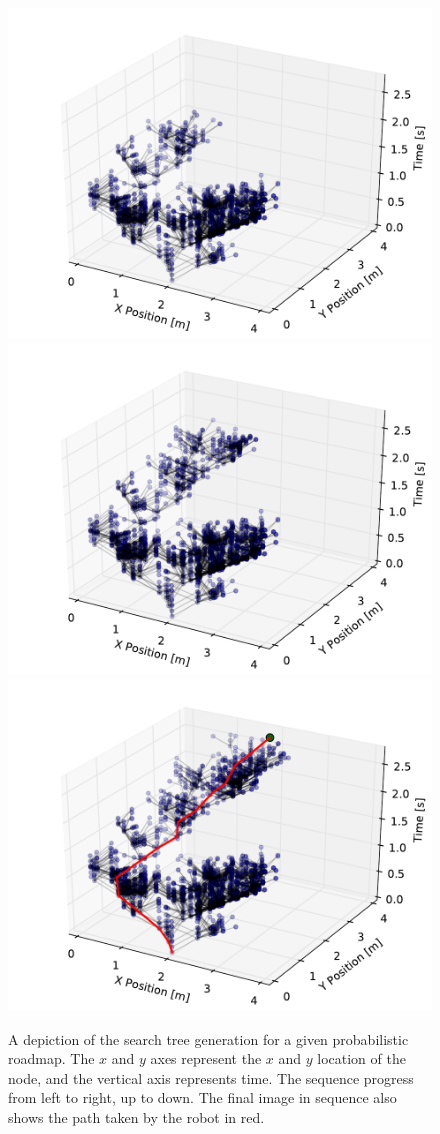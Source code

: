 \documentclass[letterpaper, 10pt, conference]{ieeeconf}
\begin{document}
\begin{figure}[h!]
    \includegraphics[width=0.32\linewidth]{figs/tree_6}
    \includegraphics[width=0.32\linewidth]{figs/tree_7}
    \includegraphics[width=0.32\linewidth]{figs/tree_8}

    \caption{A depiction of the search tree generation for a given
    probabilistic roadmap. The $x$ and $y$ axes represent the $x$ and $y$
location of the node, and the vertical axis represents time. The sequence
progress from left to right, up to down. The final image in sequence also shows
the path taken by the robot in red.}

    \label{fig:tree}
\end{figure}
\end{document}
